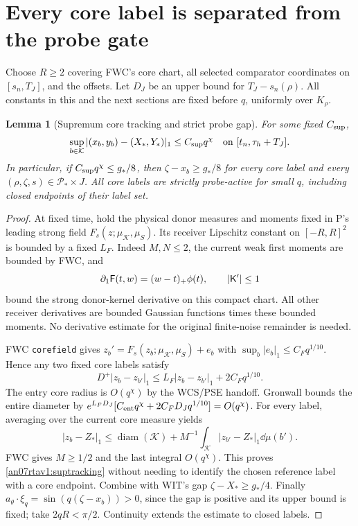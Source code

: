 \documentclass[11pt]{article}
\numberwithin{equation}{section}
\newtheorem{lemma}[theorem]{Lemma}
\newcommand{\KK}{\mathcal K}\newcommand{\BB}{\mathcal B}
\newcommand{\Ffun}{\mathsf F}
\begin{document}
\section{Every core label is separated from the probe gate}
\label{an07rtav1:coresection}
Choose \(R\ge2\) covering FWC's core chart, all selected comparator
coordinates on \([s_n,T_J]\), and the offsets. Let \(D_J\) be an
upper bound for \(T_J-s_n(\rho)\). All constants in this and the
next sections are fixed before \(q\), uniformly over \(K_\rho\).

\begin{lemma}[Supremum core tracking and strict probe gap]
\label{an07rtav1:coregap}
For some fixed \(C_{\rm sup}\),
\begin{equation}
 \sup_{b\in\KK}|(x_b,y_b)-(X_*,Y_*)|_1
                  \le C_{\rm sup}q^\chi
 \quad\text{on }[t_n,\tau_h+T_J].
 \label{an07rtav1:suptracking}
\end{equation}
In particular, if \(C_{\rm sup}q^\chi\le g_*/8\), then
\(\zeta-x_b\ge g_*/8\) for every core label and every
\((\rho,\zeta,s)\in\mathcal P_*\times J\).
All core labels are strictly probe-active for small \(q\), including
closed endpoints of their label set.
\end{lemma}
\begin{proof}
At fixed time, hold the physical donor measures and moments fixed
in P's leading strong field \(F_s(z;\mu_\KK,\mu_S)\).
Its receiver Lipschitz constant on \([-R,R]^2\) is bounded by a
fixed \(L_F\). Indeed \(M,N\le2\), the current weak first moments
are bounded by FWC, and
\[
 \partial_1\Ffun(t,w)=(w-t)_+\phi(t),\qquad
 |\Kfun'|\le1
\]
bound the strong donor-kernel derivative on this compact chart.
All other receiver derivatives are bounded Gaussian functions times
these bounded moments. No derivative estimate for the original
finite-noise remainder is needed.

FWC \texttt{corefield} gives
\(z_b'=F_s(z_b;\mu_\KK,\mu_S)+e_b\) with
\(\sup_b|e_b|_1\le C_Fq^{1/10}\). Hence any two fixed core labels
satisfy
\[
 D^+|z_b-z_{b'}|_1\le L_F|z_b-z_{b'}|_1+2C_Fq^{1/10}.
\]
The entry core radius is \(O(q^\chi)\) by the WCS/PSE handoff.
Gronwall bounds the entire diameter by
\(e^{L_FD_J}[C_{\rm ent}q^\chi+2C_FD_Jq^{1/10}]=O(q^\chi)\).
For every label, averaging over the current core measure yields
\[
 |z_b-Z_*|_1\le\operatorname{diam}(\KK)+
       M^{-1}\int_\KK|z_{b'}-Z_*|_1\dd\mu(b').
\]
FWC gives \(M\ge1/2\) and the last integral \(O(q^\chi)\).
This proves \eqref{an07rtav1:suptracking} without needing to
identify the chosen reference label with a core endpoint.
Combine with WIT's gap \(\zeta-X_*\ge g_*/4\).
Finally \(a_\theta\cdot\xi_q=\sin(q(\zeta-x_b))>0\), since
the gap is positive and its upper bound is fixed; take
\(2qR<\pi/2\). Continuity extends the estimate to closed labels.
\end{proof}
\end{document}
